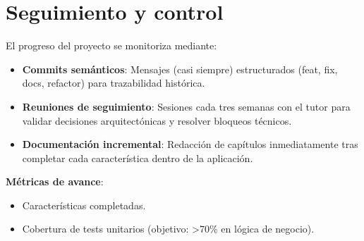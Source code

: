 \section{Seguimiento y control}

El progreso del proyecto se monitoriza mediante:

\begin{itemize}
    \item \textbf{Commits semánticos}: Mensajes (casi siempre) estructurados (feat, fix, docs, refactor) para trazabilidad histórica.
    \item \textbf{Reuniones de seguimiento}: Sesiones cada tres semanas con el tutor para validar decisiones arquitectónicas y resolver bloqueos técnicos.
    \item \textbf{Documentación incremental}: Redacción de capítulos inmediatamente tras completar cada característica dentro de la aplicación.
\end{itemize}

\textbf{Métricas de avance}:
\begin{itemize}
    \item Características completadas.
    \item Cobertura de tests unitarios (objetivo: >70\% en lógica de negocio).
\end{itemize}